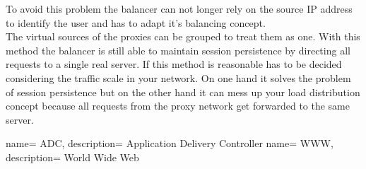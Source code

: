 \documentclass[12p]{article}
\begin{document}
	To avoid this problem the balancer can not longer rely on the source IP address to identify the user and has to adapt it's balancing concept.\\
	The virtual sources of the proxies can be grouped to treat them as one. With this method the balancer is still able to maintain session persistence by directing all requests to a single real server. If this method is reasonable has to be decided considering the traffic scale in your network. On one hand it solves the problem of session persistence but on the other hand it can mess up your load distribution concept because all requests from the proxy network get forwarded to the same server.
	
	\newpage
	 {
		name= ADC,
		description= {Application Delivery Controller}
	}
	 {
		name= WWW,
		description= {World Wide Web}
	}
	\printglossaries
	
	\newpage
	
	
	
	\newpage
\end{document}
